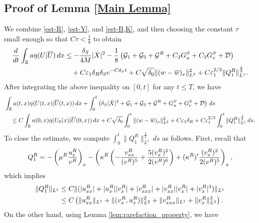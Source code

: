 \documentclass[11pt,reqno]{amsart}
\begin{document}
    \subsection{Proof of Lemma \ref{Main Lemma}}
    We combine \eqref{est-R}, \eqref{est-Y}, and \eqref{est-B,K}, and then choosing the constant $\tau$ small enough so that $C\tau <\frac{1}{8}$ to obtain
    \begin{align*}
    \frac{d}{dt} \int_\mathbb{R} a \eta (U | \overline{U} ) \, dx &\le -\frac{\delta_S}{4M} |\dot{X}|^2 -\frac{1}{8} \left( \mathcal{G}_1 + \mathcal{G}_3 +\mathcal{G}^R + C_2 G^S_u + C_3 G^S_v + \mathcal{D} \right) \\
     & \quad +C \varepsilon_1 \delta_R \delta_S e^{-C \delta_S t} + C \sqrt{\delta_0} \| (w-\overline{w})_x\|_{L^2}^2 + C\varepsilon_1^{2/3} \| Q_1^R \|_{L^1}^{\frac{4}{3}}.
    \end{align*}
    After integrating the above inequality on $[0,t]$ for any $t \le T$, we have
    \begin{align*}
    & \int_\mathbb{R} a(t,x) \eta (U (t,x) | \overline{U} (t,x) ) \, dx + \int_0^t \left( \delta_S |\dot{X}|^2 + \mathcal{G}_1+ \mathcal{G}_3 +\mathcal{G}^R + G^S_u+ G^S_v+ \mathcal{D} \right) \, ds \\ 
    & \quad \le C  \int_\mathbb{R} a(0,x) \eta ( U_0(x)| \overline{U}(0,x)) \, dx + C \sqrt{\delta_0} \int_0^t \|(w-\overline{w})_x\|_{L^2}^2 + C \varepsilon_1 \delta_R    + C\varepsilon_1^{2/3} \int_0^t \|Q_1^R\|_{L^1}^{\frac43}\,ds.
    \end{align*}
    To close the estimate, we compute $\int_0^t\|Q_1^R\|_{L^1}^{\frac43}\,ds$ as follows. First, recall that
    \[Q_1^R=-\left(\mu^R\frac{u^R_x}{v^R} \right)_x-\left(\kappa^R \left(-\frac{v^R_{xx}}{(v^R)^5} + \frac{5(v^R_x)^2}{2(v^R)^6} \right) + (\kappa^R)' \frac{(v^R_x)^2}{2(v^R)^5} \right)_x,\]
    which implies 
    \begin{align*}
    \begin{aligned} %
    \|Q_1^R\|_{L^1} &\le C \|( |\ur_{xx}| + |\ur_{x}| |\vr_{x}| +|\vr_{xxx}|+|\vr_{xx}| |\vr_{x}| + |\vr_{x}|^3)\|_{L^1}\\
    &\le C \left( \|\ur_{xx}\|_{L^1} + \|(\vr_{x},\ur_{x})\|_{L^2}^2 +\|\vr_{xxx}\|_{L^1} + \|\vr_{x}\|_{L^3}^3 \right).
    \end{aligned}
    \end{align*}
    On the other hand, using Lemma \ref{lem:rarefaction_property}, we have
\end{document}
